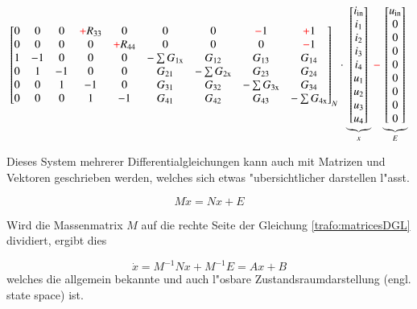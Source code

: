 \begin{refsection}
{\begin{align}
{\begin{bmatrix}
			0&0&0&\color{red}+\color{black}R_{33}&0 & 0&0&\color{red}-\color{black}1&\color{red}+\color{black}1 \\
			0&0&0&0&\color{red}+\color{black}R_{44} & 0&0&0&\color{red}-\color{black}1 \\
			1&-1&0&0&0 & -\sum G_{1\mathrm{x}}&G_{12}&G_{13}&G_{14} \\
			0&1&-1&0&0 & G_{21} &- \sum G_{2\mathrm{x}}& G_{23}& G_{24} \\
			0&0&1&-1&0 & G_{31} & G_{32} &-\sum G_{3\mathrm{x}}&G_{34} \\
			0&0&0&1&-1 & G_{41}&G_{42}&G_{43}&-\sum G_{4\mathrm{x}}
			\end{bmatrix}}_{\text{$N$}}
			\cdot
			\underbrace{\begin{bmatrix}
			i_\mathrm{in} \\
			i_1 \\
			i_2 \\
			i_3 \\
			i_4 \\
			u_1 \\
			u_2 \\
			u_3 \\
			u_4
			\end{bmatrix}}_{\text{$x$}}
			\color{red}-\color{black}
			\underbrace{\begin{bmatrix}
			u_\mathrm{in} \\
			0 \\
			0 \\
			0 \\
			0 \\
			0 \\
			0 \\
			0 \\
			0
			\end{bmatrix}}_{\text{$E$}}
			\label{trafo:symmetricalDGL}
\end{align}
}

Dieses System mehrerer Differentialgleichungen kann auch mit Matrizen und Vektoren geschrieben werden, welches sich etwas "ubersichtlicher darstellen l"asst. 

\begin{equation}
	M \dot x = N x + E
	\label{trafo:matricesDGL}
\end{equation}

Wird die Massenmatrix $M$ auf die rechte Seite der Gleichung \ref{trafo:matricesDGL} dividiert, ergibt dies

\begin{equation}
	\dot{x} = M^{-1}N x + M^{-1} E = A x + B
\end{equation}
welches die allgemein bekannte und auch l"osbare Zustandsraumdarstellung  (engl. state space) ist.


\end{refsection}

